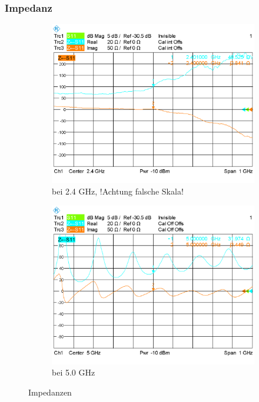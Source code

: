 \subsubsection{Impedanz}
\label{section:Impedanz}
\begin{figure}[h!]
	\begin{center}
		\begin{subfigure}[t]{0.49\textwidth}
			\begin{center}
				\includegraphics[width=1\textwidth]{../fig/plt/IMP_WITH_2_4.PNG}
				\caption{bei 2.4 GHz, !Achtung falsche Skala!}
				\label{fig:Imp_with_full_2.4}
			\end{center}
		\end{subfigure}
		\begin{subfigure}[t]{0.49\textwidth}
			\begin{center}
				\includegraphics[width=1\textwidth]{../fig/plt/IMP_WITH_5_0.PNG}
				\caption{bei 5.0 GHz}
				\label{fig:Imp_with_full_5.0}
			\end{center}
		\end{subfigure}
		\caption{Impedanzen}
		\label{fig:Imp_each}
	\end{center}
\end{figure}

